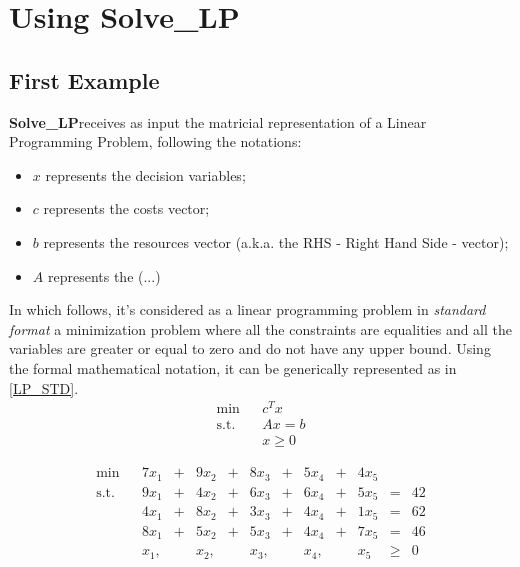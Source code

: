 \documentclass[12pt,hidelinks]{article}
\newcommand{\SolveLP}{\textbf{Solve\_LP}}
\newcommand{\st}{\operatorname{s.t.}}
\begin{document}
\section{Using \SolveLP}
\vspace{10.5cm}
	\subsection{First Example}
		\SolveLP receives as input the matricial representation of a Linear Programming Problem, following the notations:

		\begin{itemize}
			\item $x$ represents the decision variables;
			\item $c$ represents the costs vector;
			\item $b$ represents the resources vector (a.k.a. the RHS - Right Hand Side - vector);
			\item $A$ represents the (...)
		\end{itemize}

		In which follows, it's considered as a linear programming problem in \emph{standard format} a minimization problem where all the constraints are equalities and all the variables are greater or equal to zero and do not have any upper bound. Using the formal mathematical notation, it can be generically represented as in \eqref{LP_STD}. 
		\begin{equation}\label{LP_STD}
			\begin{array}{llc}
				\min                & &  c^T x          \\
				\operatorname{s.t.} & &  Ax = b         \\
									& &   x \geqslant 0
			\end{array}
		\end{equation}

			\begin{equation}\label{LP_1_0_0}
				\begin{array}{llrcrcrcrcrcr}
				\min  & & 7x_1  & + & 9x_2  & + & 8x_3  & + & 5x_4  & + & 4x_5 &           &    \\
				\st   & & 9x_1  & + & 4x_2  & + & 6x_3  & + & 6x_4  & + & 5x_5 & =         & 42 \\
					  & & 4x_1  & + & 8x_2  & + & 3x_3  & + & 4x_4  & + & 1x_5 & =         & 62 \\
					  & & 8x_1  & + & 5x_2  & + & 5x_3  & + & 4x_4  & + & 7x_5 & =         & 46 \\
					  & &  x_1, &   &  x_2, &   &  x_3, &   &  x_4, &   &  x_5 & \geqslant & 0
				\end{array}
				\tag{LP1}
			\end{equation}
\end{document}
